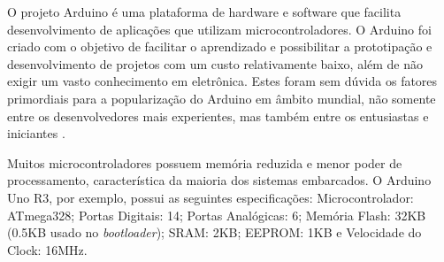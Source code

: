 \documentclass[12pt]{uftpibicsic2018}
\begin{document}




O projeto Arduino é uma plataforma de hardware e software que facilita desenvolvimento de aplicações que utilizam microcontroladores. O Arduino foi criado com o objetivo de facilitar o aprendizado e possibilitar a prototipação e desenvolvimento de projetos com um custo relativamente baixo, além de não exigir um vasto conhecimento em eletrônica. Estes foram sem dúvida os fatores primordiais para a popularização do Arduino em âmbito mundial, não somente entre os desenvolvedores mais experientes, mas também entre os entusiastas e iniciantes \cite{marcos}.

Muitos microcontroladores possuem memória reduzida e menor poder de processamento, característica da maioria dos sistemas embarcados. O Arduino Uno R3, por exemplo, possui as seguintes especificações: Microcontrolador: ATmega328; Portas Digitais: 14; Portas Analógicas: 6; Memória Flash: 32KB (0.5KB usado no {\it bootloader}); SRAM: 2KB; EEPROM: 1KB e Velocidade do Clock: 16MHz.
\end{document}
